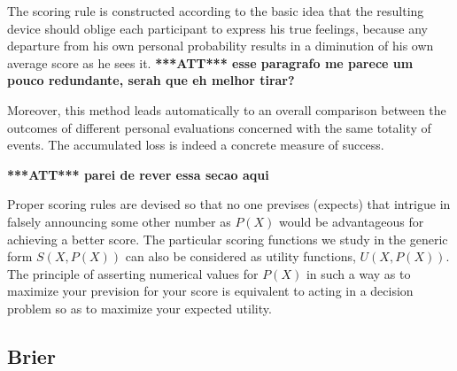 \documentclass[journal,article,accept,moreauthors,pdftex,12pt,a4paper]{mdpi}
\newcommand{\red}[1]{\textbf{\color{red} ***ATT*** #1}}
\begin{document}
The scoring rule is constructed according to the basic idea that the resulting device should oblige each participant to express his true feelings, because any departure from his own personal probability results in a diminution of his own average score as he sees it. \red{esse paragrafo me parece um pouco redundante, serah que eh melhor tirar?}

Moreover, this method leads automatically to an overall comparison between the outcomes of different personal evaluations concerned with the same totality of events.
The accumulated loss is indeed a  concrete measure of success.


\red{parei de rever essa secao aqui}

Proper scoring rules are devised so that no one previses (expects) that intrigue in falsely announcing some other number as $P(X)$ would be advantageous for achieving a better score.
The particular scoring functions we study in the generic form $S(X,P(X))$ can also be considered as utility functions, $U(X,P(X))$.
The principle of asserting numerical values for $P(X)$ in such a way as to maximize your prevision for your score is equivalent to acting in a decision problem so as to maximize your expected utility.



\subsection{Brier }
\end{document}
